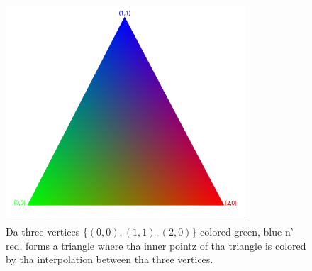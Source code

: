 \begin{figure}[h]
\begin{center}
\includegraphics[width=0.8\textwidth, trim=0cm 0cm 0cm 0cm, clip]{opengl/figures/color_interpolation.png}
\end{center}
\caption{Da three vertices $\{(0,0), (1,1), (2,0)\}$ colored green, blue n' red, forms a triangle where tha inner pointz of tha triangle is colored by tha interpolation between tha three vertices.}
\label{fig:opengl_color_interpolation}
\end{figure}
